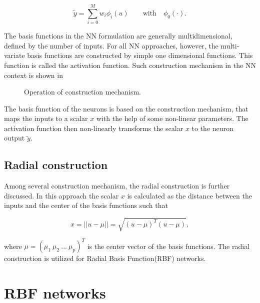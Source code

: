 \begin{equation}
\label{basis_NN_eq_lin_bias}
\tilde{y} = \sum_{i = 0}^M w_i \phi_i(u) \qquad \text{with} \quad \phi_0(\cdot).
\end{equation}

The basis functions in the NN formulation are generally multidimensional, defined by the number of inputs. For all NN approaches, however, the multi-variate basis functions are constructed by simple one dimensional functions\cite{nelles2013nonlinear}. This function is called the activation function. Such construction mechanism in the NN context is shown in 

\begin{figure}[H]
\centering
 
\caption{Operation of construction mechanism.}
\label{fig:activation_mechanism}
\end{figure}

\vspace{-3mm}

The basis function of the neurons is based on the construction mechanism, that maps the inputs to a scalar $x$ with the help of some non-linear parameters. The activation function then non-linearly transforms the scalar $x$ to the neuron output $\tilde{y}$. 

\subsection{Radial construction}
\label{radial construction}

Among several construction mechanism, the radial construction is further discussed. In this approach the scalar $x$ is calculated as the distance between the inputs and the center of the basis functions such that 

 \begin{equation}
\label{radial_structure}
x = ||u- \mu|| = \sqrt{(u-\mu)^T (u-\mu)},
\end{equation}

where $\mu = (\mu_1 \ \mu_2 \ ... \ \mu_p)^T$ is the center vector of the basis functions. The radial construction is utilized for Radial Basis Function(RBF) networks.


\section{RBF networks}
\label{Radial_basis_function_networks}

